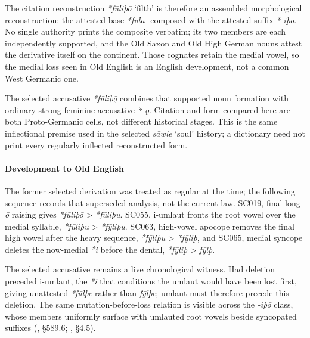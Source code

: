 \documentclass[
  british,
  a4paper,
]{article}
\providecommand{\Recon}[1]{\emph{*#1}}
\begin{document}
The citation reconstruction \Recon{fūliþō} `filth' is therefore an
assembled morphological reconstruction: the attested base \emph{*fūla-}
composed with the attested suffix \emph{*-iþō}. No single authority
prints the composite verbatim; its two members are each independently
supported, and the Old Saxon and Old High German nouns attest the
derivative itself on the continent. Those cognates retain the medial
vowel, so the medial loss seen in Old English is an English development,
not a common West Germanic one.

The selected accusative \Recon{fūliþǭ} combines that supported noun
formation with ordinary strong feminine accusative \emph{*-ǭ}. Citation
and form compared here are both Proto-Germanic cells, not different
historical stages. This is the same inflectional premise used in the
selected \emph{sāwle} `soul' history; a dictionary need not print every
regularly inflected reconstructed form.

\paragraph{Development to Old
English}\label{development-to-old-english-21}

The former selected derivation was treated as regular at the time; the
following sequence records that superseded analysis, not the current
law. SC019, final long-\emph{ō} raising gives \emph{*fūliþō}
\textgreater{} \emph{*fūliþu}. SC055, i-umlaut fronts the root vowel
over the medial syllable, \emph{*fūliþu} \textgreater{} \emph{*fȳliþu}.
SC063, high-vowel apocope removes the final high vowel after the heavy
sequence, \emph{*fȳliþu} \textgreater{} \emph{*fȳliþ}, and SC065, medial
syncope deletes the now-medial \emph{*i} before the dental,
\emph{*fȳliþ} \textgreater{} \emph{fȳlþ}.

The selected accusative remains a live chronological witness. Had
deletion preceded i-umlaut, the \emph{*i} that conditions the umlaut
would have been lost first, giving unattested \emph{*fūlþe} rather than
\emph{fȳlþe}; umlaut must therefore precede this deletion. The same
mutation-before-loss relation is visible across the \emph{-iþō} class,
whose members uniformly surface with umlauted root vowels beside
syncopated suffixes (,
§589.6; ,
§4.5).
\end{document}

